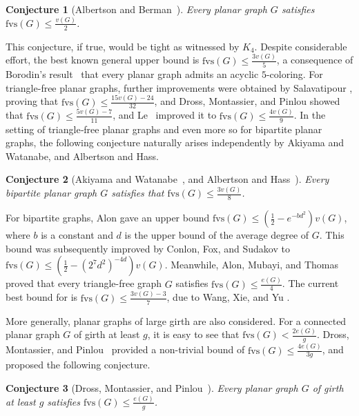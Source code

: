 \documentclass[a4paper,12pt]{article}
\theoremstyle{plain}
\newtheorem{conjecture}[conjecture]{Conjecture}
\theoremstyle{definition}
\theoremstyle{remark}
\numberwithin{equation}{section}
\begin{document}
\begin{conjecture}[Albertson and Berman~\cite{AB1979}]\label{conj:planar}
Every planar graph $G$ satisfies $\mathrm{fvs}(G)\leq \frac{v(G)}{2}$.
\end{conjecture}

This conjecture, if true, would be tight as witnessed by $K_4$. Despite considerable effort, the best known general upper bound is $\mathrm{fvs}(G) \leq \frac{3v(G)}{5}$, a consequence of Borodin's result~\cite{B1979} that every planar graph admits an acyclic $5$-coloring. For triangle-free planar graphs, further improvements were obtained by Salavatipour \cite{S2006}, proving that $\mathrm{fvs}(G)\le \frac{15v(G)-24}{32}$, and Dross, Montassier, and Pinlou \cite{DMP2019} showed that $\mathrm{fvs}(G)\le \frac{5v(G)-7}{11}$, and Le~\cite{L2018} improved it to $\mathrm{fvs}(G)\le \frac{4v(G)}{9}$. In the setting of triangle‑free planar graphs and even more so for bipartite planar graphs, the following conjecture naturally arises independently by Akiyama and Watanabe\cite{AW1987}, and Albertson and Hass.

\begin{conjecture}[Akiyama and Watanabe~\cite{AW1987}, and Albertson and Hass~\cite{AH1998}]\label{conj:bipartite}
Every bipartite planar graph $G$ satisfies that $\mathrm{fvs}(G)\leq \frac{3v(G)}{8}$.
\end{conjecture}

For bipartite graphs, Alon \cite{A2003} gave an upper bound $\mathrm{fvs}(G)\leq \left(\frac{1}{2}-e^{-bd^2}\right)v(G)$, where $b$ is a constant and $d$ is the upper bound of the average degree of $G$. This bound was subsequently improved by Conlon, Fox, and Sudakov \cite{CFS2014} to $\mathrm{fvs}(G)\le\left(\frac{1}{2} -(2^7d^2)^{-4d}\right)v(G)$. Meanwhile, Alon, Mubayi, and Thomas \cite{AMT2001} proved that every triangle-free graph $G$ satisfies $\mathrm{fvs}(G)\le \frac{e(G)}{4}$. The current best bound for  is $\mathrm{fvs}(G)\leq\frac{3v(G)-3}{7}$, due to Wang, Xie, and Yu \cite{WXY2017}.


More generally, planar graphs of large girth are also considered. For a connected planar graph $G$ of girth at least $g$, it is easy to see that $\mathrm{fvs}(G)<\frac{2e(G)}{g}$. Dross, Montassier, and Pinlou~\cite{DMP2016} provided a non-trivial bound of $\mathrm{fvs}(G)\le \frac{4e(G)}{3g}$, and proposed the following conjecture.

\begin{conjecture}[Dross, Montassier, and Pinlou~\cite{DMP2016}]\label{conj:dmp}
Every planar graph $G$ of girth at least $g$ satisfies $\mathrm{fvs}(G)\leq \frac{e(G)}{g}$.
\end{conjecture}
\end{document}
